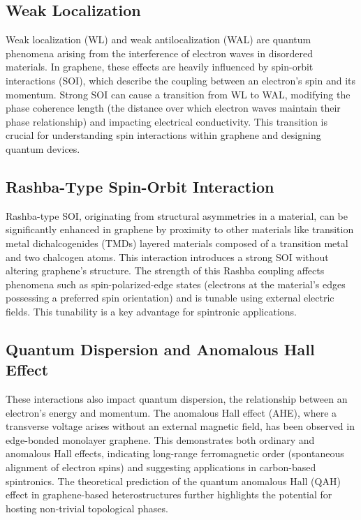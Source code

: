 \documentclass[twocolumn]{revtex4-2}
\begin{document}
    \subsection{Weak Localization}\label{subsec:weak-localization}

        Weak localization (WL) and weak antilocalization (WAL) are quantum phenomena arising from the interference of electron waves in disordered materials.
         In graphene, these effects are heavily influenced by spin-orbit interactions (SOI), which describe the coupling between an electron's spin and its momentum.
          Strong SOI can cause a transition from WL to WAL, modifying the phase coherence length (the distance over which electron waves maintain their phase relationship) and impacting electrical conductivity\cite{WeizheMaterials2017,AvsarNatCommun2014}.
           This transition is crucial for understanding spin interactions within graphene and designing quantum devices.

    \subsection{Rashba-Type Spin-Orbit Interaction}\label{subsec:rashba-type-spin-orbit-interaction}

    Rashba-type SOI, originating from structural asymmetries in a material, can be significantly enhanced in graphene by proximity to other materials like transition metal dichalcogenides (TMDs) layered materials composed of a transition metal and two chalcogen atoms.
     This interaction introduces a strong SOI without altering graphene's structure\cite{WangPhysRevX2016, AvsarNatCommun2014}.
      The strength of this Rashba coupling affects phenomena such as spin-polarized-edge states (electrons at the material's edges possessing a preferred spin orientation) and is tunable using external electric fields.
      This tunability is a key advantage for spintronic applications.

    \subsection{Quantum Dispersion and Anomalous Hall Effect}\label{subsec:quantum-dispersion-and-anomalous-hall-effect}

    These interactions also impact quantum dispersion, the relationship between an electron's energy and momentum.
    The anomalous Hall effect (AHE), where a transverse voltage arises without an external magnetic field, has been observed in edge-bonded monolayer graphene\cite{LiuNano2023}.
     This demonstrates both ordinary and anomalous Hall effects, indicating long-range ferromagnetic order (spontaneous alignment of electron spins) and suggesting applications in carbon-based spintronics\cite{YaoMater2024}.
      The theoretical prediction of the quantum anomalous Hall (QAH) effect in graphene-based heterostructures further highlights the potential for hosting non-trivial topological phases.
\end{document}
